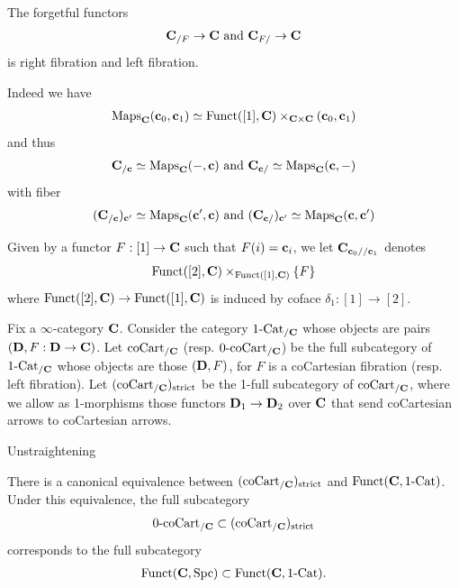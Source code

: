 {\np The forgetful functors 
\begin{align*}
    \textbf{C}_{/F} \to \textbf{C}\text{ and }\textbf{C}_{F/} \to \textbf{C}
\end{align*}
is right fibration and left fibration.

\np Indeed we have 
\begin{align*}
    \operatorname{Maps}_{\textbf{C}}(\textbf{c}_0,\textbf{c}_1)\simeq \operatorname{Funct}([1],\textbf{C})\times_{\textbf{C}\times\textbf{C}}(\textbf{c}_0,\textbf{c}_1)
\end{align*}
and thus 
\begin{align*}
    \textbf{C}_{/\textbf{c}}\simeq \operatorname{Maps}_{\textbf{C}}(-,\textbf{c}) \text{ and }
    \textbf{C}_{\textbf{c}/}\simeq \operatorname{Maps}_{\textbf{C}}(\textbf{c},-)
\end{align*}
with fiber 
\begin{align*}
    (\textbf{C}_{/\textbf{c}})_{\textbf{c}'}\simeq \operatorname{Maps}_{\textbf{C}}(\textbf{c}',\textbf{c}) \text{ and }
    (\textbf{C}_{\textbf{c}/})_{\textbf{c}'}\simeq \operatorname{Maps}_{\textbf{C}}(\textbf{c},\textbf{c}')
\end{align*}

\np Given by a functor $F:[1]\to \textbf{C}$ such that $F(i)=\textbf{c}_i$, we let $\textbf{C}_{\textbf{c}_0//\textbf{c}_1}$ denotes 
\begin{align*}
    \operatorname{Funct}([2],\textbf{C})\times_{\operatorname{Funct}([1],\textbf{C})}\{F\}
\end{align*}
where $\operatorname{Funct}([2],\textbf{C})\to \operatorname{Funct}([1],\textbf{C})$ is induced by coface $\delta_1:[1]\to [2]$.

\np Fix a $\infty$-category $\textbf{C}$. Consider the category $\text{1-Cat}_{/\textbf{C}}$ whose objects are pairs $(\textbf{D},F:\textbf{D}\to\textbf{C})$.
Let $\text{coCart}_{/\textbf{C}}$ (resp. $\text{0-coCart}_{/\textbf{C}}$) be the full subcategory of $\text{1-Cat}_{/\textbf{C}}$ whose objects are those $(\textbf{D},F)$,
for $F$ is a coCartesian fibration (resp. left fibration).
Let $(\text{coCart}_{/\textbf{C}})_{\text{strict}}$ be the 1-full subcategory of $\text{coCart}_{/\textbf{C}}$, 
where we allow as 1-morphisms those functors $\textbf{D}_1\to\textbf{D}_2$ over $\textbf{C}$ that send coCartesian arrows to coCartesian arrows.

\np Unstraightening

\np There is a canonical equivalence between $(\text{coCart}_{/\textbf{C}})_{\text{strict}}$ and $\operatorname{Funct}(\textbf{C},\text{1-Cat})$. Under this equivalence, the full subcategory 
\begin{align*}
    \text{0-coCart}_{/\textbf{C}}\subset (\text{coCart}_{/\textbf{C}})_{\text{strict}}
\end{align*}
corresponds to the full subcategory
\begin{align*}
    \operatorname{Funct}(\textbf{C},\text{Spc}) \subset \operatorname{Funct}(\textbf{C},\text{1-Cat}).
\end{align*}
\endgroup}
